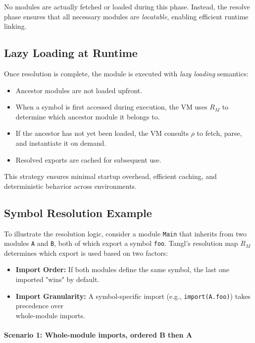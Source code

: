 \documentclass[sigplan,screen]{acmart}
\begin{document}
No modules are actually fetched or loaded during this phase. Instead, the resolve phase ensures that all necessary modules are \textit{locatable}, enabling efficient runtime linking.

\subsection{Lazy Loading at Runtime}

Once resolution is complete, the module is executed with \emph{lazy loading} semantics:

\begin{itemize}
    \item Ancestor modules are not loaded upfront.
    \item When a symbol is first accessed during execution, the VM uses $R_M$ to determine which ancestor module it belongs to.
    \item If the ancestor has not yet been loaded, the VM consults $\rho$ to fetch, parse, and instantiate it on demand.
    \item Resolved exports are cached for subsequent use.
\end{itemize}

This strategy ensures minimal startup overhead, efficient caching, and deterministic behavior across environments.


\subsection{Symbol Resolution Example}

To illustrate the resolution logic, consider a module \texttt{Main} that inherits from two modules \texttt{A} and \texttt{B}, both of which export a symbol \texttt{foo}. Tangl's resolution map $R_M$ determines which export is used based on two factors:

\begin{itemize}
    \item \textbf{Import Order:} If both modules define the same symbol, the last one imported "wins" by default.
    \item \textbf{Import Granularity:} A symbol-specific import (e.g., \texttt{import(A.foo)}) takes precedence over \\whole-module imports.
\end{itemize}

\paragraph{Scenario 1: Whole-module imports, ordered B then A}
\end{document}
